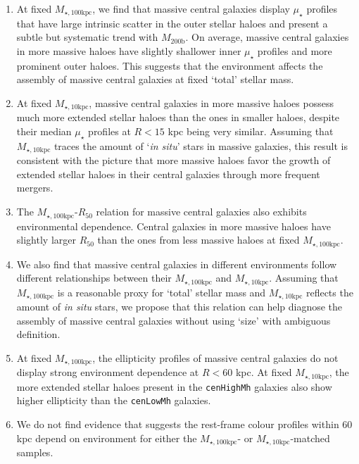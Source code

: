 \documentclass[a4paper,fleqn,usenatbib]{mnras}
\def\rbcg{\texttt{cenHighMh}}
\def\nbcg{\texttt{cenLowMh}}
\def\mhalo{{$M_{\mathrm{200b}}$}}
\def\minn{{$M_{\star,10\mathrm{kpc}}$}}
\def\mtot{{$M_{\star,100\mathrm{kpc}}$}}
\def\mden{{$\mu_{\star}$}}
\begin{document}
    \begin{enumerate}
    
        \item At fixed \mtot{}, we find that massive central galaxies display \mden{} 
            profiles that have large intrinsic scatter in the outer stellar haloes and 
            present a subtle but systematic trend with \mhalo{}.
            On average, massive central galaxies in more massive haloes have slightly 
            shallower inner \mden{} profiles and more prominent outer haloes. 
            This suggests that the environment affects the assembly of massive central
            galaxies at fixed `total' stellar mass.
            
        \item At fixed \minn{}, massive central galaxies in more massive haloes 
            possess much more extended stellar haloes than the ones in smaller haloes, 
            despite their median \mden{} profiles at $R < 15$ kpc being very similar. 
            Assuming that \minn{} traces the amount of `\textit{in situ}' stars in 
            massive galaxies, this result is consistent with the picture that more 
            massive haloes favor the growth of extended stellar haloes in their central 
            galaxies through more frequent mergers. 
        
        \item The \mtot{}-$R_{\mathrm{50}}$ relation for massive central galaxies 
            also exhibits environmental dependence. 
            Central galaxies in more massive haloes have slightly larger
            $R_{\mathrm{50}}$ than the ones from less massive haloes at fixed \mtot{}. 
        
        \item We also find that massive central galaxies in different environments
            follow different relationships between their \mtot{} and \minn{}. 
            Assuming that \mtot{} is a reasonable proxy for `total' stellar mass and 
            \minn{} reflects the amount of \textit{in situ} stars, we propose that 
            this relation can help diagnose the assembly of massive central galaxies 
            without using `size' with ambiguous definition. 
        
        \item At fixed \mtot{}, the ellipticity profiles of massive central galaxies 
            do not display strong environment dependence at $R < 60$ kpc. 
            At fixed \minn{}, the more extended stellar haloes present in the \rbcg{}
            galaxies also show higher ellipticity than the \nbcg{} galaxies. 
        
        \item We do not find evidence that suggests the rest-frame colour profiles 
            within 60 kpc depend on environment for either the \mtot{}- or 
            \minn{}-matched samples. 
             
    \end{enumerate}
    
\end{document}

